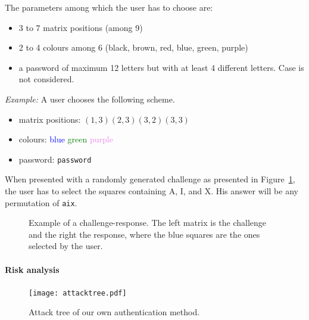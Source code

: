 \documentclass[11pt,a4paper]{article}
\begin{document}
The parameters among which the user has to choose are:
\begin{itemize}
\item 3 to 7 matrix positions (among 9)
\item 2 to 4 colours among 6 (black, brown, red, blue, green, purple)
\item a password of maximum 12 letters but with at least 4 different letters. Case is not considered.
\end{itemize}

\textit{Example:} A user chooses the following scheme.
\begin{itemize}
\item matrix positions: $(1,3) (2,3) (3,2) (3,3)$
\item colours: \textcolor{blue}{blue} \textcolor{green}{green} \textcolor{violet}{purple}
\item password: \texttt{password}
\end{itemize}

When presented with a randomly generated challenge as presented in Figure~\ref{fig:ex1}, the user has to select the squares containing A, I, and X. His answer will be any permutation of \texttt{aix}.
\begin{figure}
\centering
{}
\caption{Example of a challenge-response. The left matrix is the challenge and the right the response, where the blue squares are the ones selected by the user.}
\label{fig:ex1}
\end{figure}

\paragraph{Risk analysis}
\begin{figure}
\centering
\texttt{[image: attacktree.pdf]}
\caption{Attack tree of our own authentication method.}
\label{fig:attacktree}
\end{figure}
\end{document}
